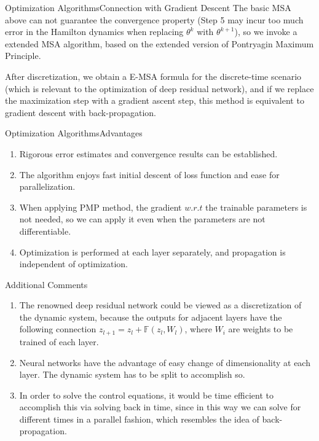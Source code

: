 \documentclass[english]{pkuslide}
\begin{document}
\begin{frame}{Optimization Algorithms}{Connection with Gradient Descent}
The basic MSA above can not guarantee the convergence property (Step 5 may incur too much error in the Hamilton dynamics when replacing $\theta^{k}$ with $\theta^{k+1}$), so we invoke a extended MSA algorithm, based on the extended version of Pontryagin Maximum Principle.

After discretization, we obtain a E-MSA formula for the discrete-time scenario (which is relevant to the optimization of deep residual network), and if we replace the maximization step with a gradient ascent step, this method is equivalent to gradient descent with back-propagation.

\end{frame}
\begin{frame}{Optimization Algorithms}{Advantages}
\begin{enumerate}
\item Rigorous error estimates and convergence results can be established.
\item The algorithm enjoys fast initial descent of loss function and ease for parallelization.
\item When applying PMP method, the gradient $w.r.t$ the trainable parameters is not needed, so we can apply it even when the parameters are not differentiable. 
\item Optimization is performed at each layer separately, and propagation is independent of optimization.
\end{enumerate}
\end{frame}
\begin{frame}{Additional Comments}
\begin{enumerate}[<+->]
\item The renowned deep residual network could be viewed as a discretization of the dynamic system, because the outputs for adjacent layers have the following connection \begin{math}z_{l+1}=z_{l}+\mathbb{F}(z_{l},W_{l})\end{math}, where $W_{i}$ are weights to be trained of each layer.
\item Neural networks have the advantage of easy change of dimensionality at each layer. The dynamic system has to be split to accomplish so.
\item In order to solve the control equations, it would be time efficient to accomplish this via solving back in time, since in this way we can solve for different times in a parallel fashion, which resembles the idea of back-propagation. 
\end{enumerate}
\end{frame}
\end{document}
